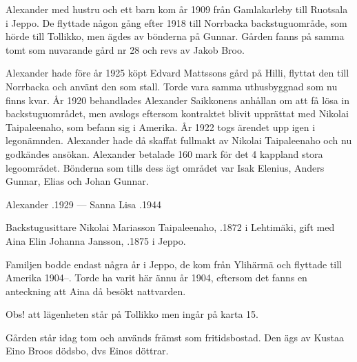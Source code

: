Alexander med hustru och ett barn kom år 1909 från Gamlakarleby till Ruotsala i Jeppo. De flyttade någon gång efter 1918 till Norrbacka backstuguområde, som hörde till Tollikko, men ägdes av bönderna på Gunnar. Gården fanns på samma tomt som nuvarande gård nr 28 och revs av Jakob Broo.

Alexander hade före år 1925 köpt Edvard Mattssons gård på Hilli, flyttat den till Norrbacka och använt den som stall. Torde vara samma uthusbyggnad som nu finns kvar. År 1920 behandlades Alexander Saikkonens anhållan om att få lösa in backstuguområdet, men avslogs eftersom kontraktet blivit upprättat med Nikolai Taipaleenaho, som befann sig i Amerika. År 1922 togs ärendet upp igen i legonämnden. Alexander hade då skaffat fullmakt av Nikolai Taipaleenaho och nu godkändes ansökan. Alexander betalade 160 mark för det 4 kappland stora legoområdet. Bönderna som tills dess ägt området var Isak Elenius, Anders Gunnar, Elias och Johan Gunnar.

Alexander .1929  ---  Sanna Lisa .1944


Backstugusittare Nikolai Mariasson Taipaleenaho, .1872 i Lehtimäki, gift med Aina Elin Johanna Jansson, .1875 i Jeppo.
\begin{jhchildren}
  \item {}
  \item {}
  \item {}
\end{jhchildren}

Familjen bodde endast några år i Jeppo, de kom från Ylihärmä och flyttade till Amerika 1904--. Torde ha varit här ännu år 1904, eftersom det fanns en anteckning att Aina då besökt nattvarden.



Obs! att lägenheten står på Tollikko men ingår på karta 15.


Gården står idag tom och används främst som fritidsbostad. Den ägs av Kustaa Eino Broos dödsbo, dvs Einos döttrar.\jhvspace{}



